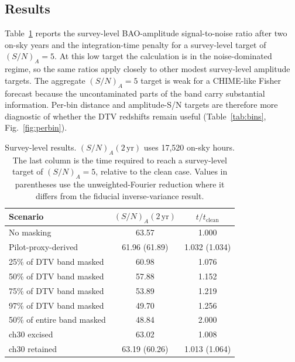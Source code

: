 \subsection{Results}
\label{sec:results}

Table~\ref{tab:survey} reports the survey-level BAO-amplitude
signal-to-noise ratio after two on-sky years and the integration-time
penalty for a survey-level target of $(S/N)_A=5$. At this low target
the calculation is in the noise-dominated regime, so the same ratios
apply closely to other modest survey-level amplitude targets. The
aggregate $(S/N)_A=5$ target is weak for a CHIME-like Fisher forecast
because the uncontaminated parts of the band carry substantial
information. Per-bin distance and amplitude-S/N targets are therefore
more diagnostic of whether the DTV redshifts remain useful
(Table~\ref{tab:bins}, Fig.~\ref{fig:perbin}).

\begin{table}[t]
\centering
\caption{Survey-level results. $(S/N)_A(2\,\mathrm{yr})$ uses 17,520
on-sky hours. The last column is the time required to reach a
survey-level target of $(S/N)_A=5$, relative to the clean case. Values
in parentheses use the unweighted-Fourier reduction where it differs
from the fiducial inverse-variance result.}
\label{tab:survey}
\small
\setlength{\tabcolsep}{4pt}
\begin{tabular}{lcc}
\toprule
Scenario & $(S/N)_A(2\,\mathrm{yr})$ & $t/t_\mathrm{clean}$ \\
\midrule
No masking & 63.57 & 1.000 \\
Pilot-proxy-derived & 61.96 (61.89) & 1.032 (1.034) \\
25\% of DTV band masked & 60.98 & 1.076 \\
50\% of DTV band masked & 57.88 & 1.152 \\
75\% of DTV band masked & 53.89 & 1.219 \\
97\% of DTV band masked & 49.70 & 1.256 \\
50\% of entire band masked & 48.84 & 2.000 \\
ch30 excised & 63.02 & 1.008 \\
ch30 retained & 63.19 (60.26) & 1.013 (1.064) \\
\bottomrule
\end{tabular}
\end{table}

